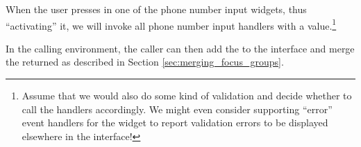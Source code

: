 When the user presses  in one of the phone number input
widgets, thus ``activating'' it, we will invoke all phone number input
handlers with a  value.\footnote{Assume that we would
  also do some kind of validation and decide whether to call the
  handlers accordingly.  We might even consider supporting ``error''
  event handlers for the widget to report validation errors to be
  displayed elsewhere in the interface!}

In the calling environment, the caller can then add the
 to the interface and merge the returned
 as described in Section
\ref{sec:merging_focus_groups}.
